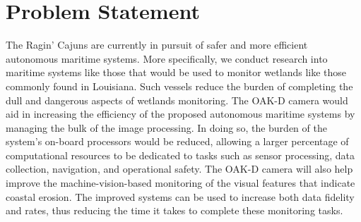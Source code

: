 \documentclass[12 pt]{article}
\begin{document}
\section{Problem Statement}
\label{sec:problem_statement}
\vspace{-0.2in}
%
The Ragin' Cajuns are currently in pursuit of safer and more efficient autonomous maritime systems. More specifically, we conduct research into maritime systems like those that would be used to monitor wetlands like those commonly found in Louisiana. Such vessels reduce the burden of completing the dull and dangerous aspects of wetlands monitoring. The OAK-D camera would aid in increasing the efficiency of the proposed autonomous maritime systems by managing the bulk of the image processing. In doing so, the burden of the system's on-board processors would be reduced, allowing a larger percentage of computational resources to be dedicated to tasks such as sensor processing, data collection, navigation, and operational safety. The OAK-D camera will also help improve the machine-vision-based monitoring of the visual features that indicate coastal erosion. The improved systems can be used to increase both data fidelity and rates, thus reducing the time it takes to complete these monitoring tasks. 

\end{document}

